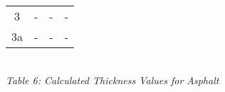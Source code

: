 \documentclass{article}
\begin{document}
\begin{center}
\begin{tabular}{|c|ccc|}
        3              & -                            & -                          & -                                 \\
        3a             & -                            & -                         & -                                 \\\hline
        \end{tabular}
    \vspace{3mm}
    \emph{\\Table 6: Calculated Thickness Values for Asphalt}
    \newpage



    \begin{spacing}{1.6}




\end{spacing}
\end{center}
\end{document}

